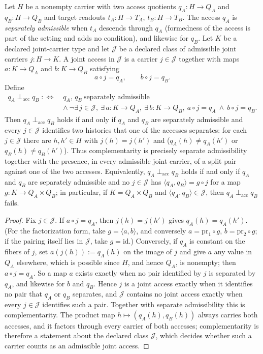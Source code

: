 \begin{theorem}\label{thm:F37}
Let \(H\) be a nonempty carrier with two access quotients
\(q_A:H\to Q_A\) and \(q_B:H\to Q_B\) and target readouts
\(t_A:H\to T_A\), \(t_B:H\to T_B\).  The access \(q_A\) is
\emph{separately admissible} when \(t_A\) descends through \(q_A\)
(formedness of the access is part of the setting and adds no condition), and
likewise for \(q_B\).  Let \(K\) be a declared
joint-carrier type and let \(\mathcal J\) be a declared class of
admissible joint carriers \(j:H\to K\).  A joint access in
\(\mathcal J\) is a carrier \(j\in\mathcal J\) together with maps
\(a:K\to Q_A\) and \(b:K\to Q_B\) satisfying
\[
  a\circ j=q_A,\qquad b\circ j=q_B .
\]
Define
\begin{align*}
  q_A \perp_{\mathrm{acc}} q_B
  \;:\Longleftrightarrow\;&
  q_A,\,q_B\ \text{separately admissible}\\
  &\wedge\ \neg\exists\, j\in\mathcal J,\ \exists\,a:K\to Q_A,\ \exists\,b:K\to Q_B,\
  a\circ j=q_A\ \wedge\ b\circ j=q_B .
\end{align*}
Then \(q_A \perp_{\mathrm{acc}} q_B\) holds if and only if \(q_A\) and \(q_B\) are separately admissible and every
\(j\in\mathcal J\) identifies two histories that one of the accesses
separates: for each \(j\in\mathcal J\) there are \(h,h'\in H\) with
\(j(h)=j(h')\) and (\(q_A(h)\neq q_A(h')\) or \(q_B(h)\neq q_B(h')\)).
Thus complementarity is precisely separate admissibility together with the presence, in every admissible joint
carrier, of a split pair against one of the two accesses. Equivalently, \(q_A\perp_{\mathrm{acc}}q_B\) holds if and only if \(q_A\) and \(q_B\) are separately admissible and no \(j\in\mathcal J\) has
\(\langle q_A,q_B\rangle=g\circ j\) for a map \(g:K\to Q_A\times Q_B\); in
particular, if \(K=Q_A\times Q_B\) and \(\langle q_A,q_B\rangle\in\mathcal J\),
then \(q_A\perp_{\mathrm{acc}}q_B\) fails.
\end{theorem}
\begin{proof}
Fix
\(j\in\mathcal J\). If \(a\circ j=q_A\), then \(j(h)=j(h')\) gives
\(q_A(h)=q_A(h')\). (For the factorization form, take \(g=\langle a,b\rangle\), and
conversely \(a=\mathrm{pr}_1\circ g\), \(b=\mathrm{pr}_2\circ g\); if the pairing
itself lies in \(\mathcal J\), take \(g=\mathrm{id}\).) Conversely, if \(q_A\) is constant on the fibers of
\(j\), set \(a(j(h)):=q_A(h)\) on the image of \(j\) and give \(a\) any value
in \(Q_A\) elsewhere, which is possible since \(H\), and hence \(Q_A\), is
nonempty; then \(a\circ j=q_A\). So a map \(a\) exists exactly when no pair
identified by \(j\) is separated by \(q_A\), and likewise for \(b\) and
\(q_B\). Hence \(j\) is a joint access exactly when it identifies no pair that
\(q_A\) or \(q_B\) separates, and \(\mathcal J\) contains no joint access
exactly when every \(j\in\mathcal J\) identifies such a pair. Together with
separate admissibility this is complementarity. The product map
\(h\mapsto(q_A(h),q_B(h))\) always carries both accesses, and it factors
through every carrier of both accesses; complementarity is
therefore a statement about the declared class \(\mathcal J\), which
decides whether such a carrier counts as an admissible joint access.
\end{proof}

